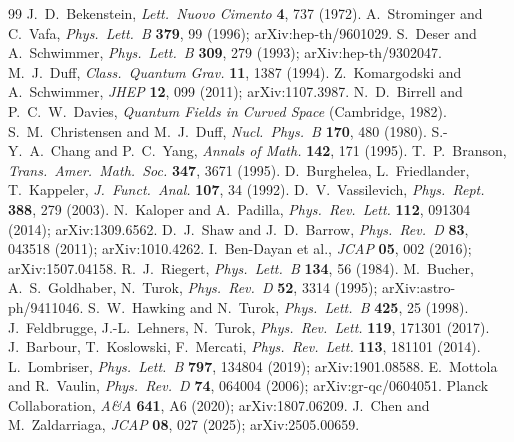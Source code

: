 \documentclass[11pt,a4paper]{article}
\theoremstyle{plain}
\theoremstyle{definition}
\theoremstyle{remark}
\begin{document}
\begin{thebibliography}{99}
 J.~D.~Bekenstein, \textit{Lett.\ Nuovo Cimento} \textbf{4}, 737 (1972).
 A.~Strominger and C.~Vafa, \textit{Phys.\ Lett.\ B} \textbf{379}, 99 (1996); arXiv:hep-th/9601029.
 S.~Deser and A.~Schwimmer, \textit{Phys.\ Lett.\ B} \textbf{309}, 279 (1993); arXiv:hep-th/9302047.
 M.~J.~Duff, \textit{Class.\ Quantum Grav.} \textbf{11}, 1387 (1994).
 Z.~Komargodski and A.~Schwimmer, \textit{JHEP} \textbf{12}, 099 (2011); arXiv:1107.3987.
 N.~D.~Birrell and P.~C.~W.~Davies, \textit{Quantum Fields in Curved Space} (Cambridge, 1982).
 S.~M.~Christensen and M.~J.~Duff, \textit{Nucl.\ Phys.\ B} \textbf{170}, 480 (1980).
 S.-Y.~A.~Chang and P.~C.~Yang, \textit{Annals of Math.} \textbf{142}, 171 (1995).
 T.~P.~Branson, \textit{Trans.\ Amer.\ Math.\ Soc.} \textbf{347}, 3671 (1995).
 D.~Burghelea, L.~Friedlander, T.~Kappeler, \textit{J.\ Funct.\ Anal.} \textbf{107}, 34 (1992).
 D.~V.~Vassilevich, \textit{Phys.\ Rept.} \textbf{388}, 279 (2003).
 N.~Kaloper and A.~Padilla, \textit{Phys.\ Rev.\ Lett.} \textbf{112}, 091304 (2014); arXiv:1309.6562.
 D.~J.~Shaw and J.~D.~Barrow, \textit{Phys.\ Rev.\ D} \textbf{83}, 043518 (2011); arXiv:1010.4262.
 I.~Ben-Dayan et al., \textit{JCAP} \textbf{05}, 002 (2016); arXiv:1507.04158.
 R.~J.~Riegert, \textit{Phys.\ Lett.\ B} \textbf{134}, 56 (1984).
 M.~Bucher, A.~S.~Goldhaber, N.~Turok, \textit{Phys.\ Rev.\ D} \textbf{52}, 3314 (1995); arXiv:astro-ph/9411046.
 S.~W.~Hawking and N.~Turok, \textit{Phys.\ Lett.\ B} \textbf{425}, 25 (1998).
 J.~Feldbrugge, J.-L.~Lehners, N.~Turok, \textit{Phys.\ Rev.\ Lett.} \textbf{119}, 171301 (2017).
 J.~Barbour, T.~Koslowski, F.~Mercati, \textit{Phys.\ Rev.\ Lett.} \textbf{113}, 181101 (2014).
 L.~Lombriser, \textit{Phys.\ Lett.\ B} \textbf{797}, 134804 (2019); arXiv:1901.08588.
 E.~Mottola and R.~Vaulin, \textit{Phys.\ Rev.\ D} \textbf{74}, 064004 (2006); arXiv:gr-qc/0604051.
 Planck Collaboration, \textit{A\&A} \textbf{641}, A6 (2020); arXiv:1807.06209.
 J.~Chen and M.~Zaldarriaga, \textit{JCAP} \textbf{08}, 027 (2025); arXiv:2505.00659.

\end{thebibliography}
\end{document}
